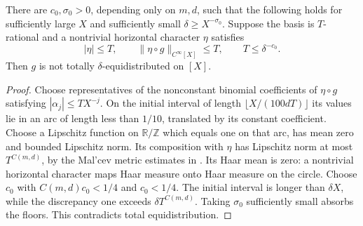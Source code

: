 \begin{lemma}\label{lem:gn-horizontal-obstruction}
There are $c_0,\sigma_0>0$, depending only on $m,d$, such that the
following holds for sufficiently large $X$ and sufficiently small
$\delta\geq X^{-\sigma_0}$. Suppose the basis is $T$-rational and
a nontrivial horizontal character $\eta$ satisfies
\[
 |\eta|\leq T,\qquad \|\eta\circ g\|_{C^\infty[X]}\leq T,
 \qquad T\leq\delta^{-c_0}.
\]
Then $g$ is not totally $\delta$-equidistributed on $[X]$.
\end{lemma}
\begin{proof}
Choose representatives of the nonconstant binomial coefficients of
$\eta\circ g$ satisfying $|\alpha_j|\leq TX^{-j}$. On the initial
interval of length $\lfloor X/(100dT)\rfloor$ its values lie in an arc
of length less than $1/10$, translated by its constant coefficient.
Choose a Lipschitz function on $\mathbb R/\mathbb Z$ which equals one on
that arc, has mean zero and bounded Lipschitz norm. Its composition with
$\eta$ has Lipschitz norm at most $T^{C(m,d)}$, by the Mal'cev metric
estimates in \cite[Appendix A]{GTOrbits2012}. Its Haar mean is zero:
a nontrivial horizontal character maps Haar measure onto Haar measure
on the circle. Choose $c_0$ with $C(m,d)c_0<1/4$ and $c_0<1/4$.
The initial interval is longer than $\delta X$, while the discrepancy
one exceeds $\delta T^{C(m,d)}$. Taking $\sigma_0$ sufficiently small
absorbs the floors. This contradicts total equidistribution.
\end{proof}

